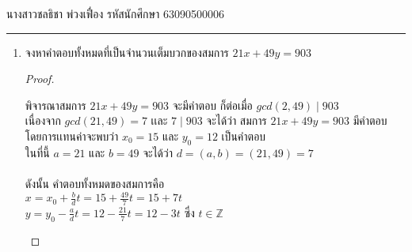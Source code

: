 \documentclass[12pt, a4paper]{article}
\begin{document}
\raggedleft นางสาวชลธิชา พ่วงเฟื่อง  รหัสนักศึกษา 63090500006 \\[12pt]
\hrule\vspace{12pt}
\raggedright

\begin{enumerate}
    \item จงหาคำตอบทั้งหมดที่เป็นจำนวนเต็มบวกของสมการ $21x+49y=903$\\ 
    
    
    \begin{proof}
        \begin{enumerate}พิจารณาสมการ $21x+49y=903$ จะมีคำตอบ ก็ต่อเมื่อ $gcd(2,49)\mid 903$\\
            เนื่องจาก $gcd(21,49)=7$ เเละ $7\mid 903$ จะได้ว่า สมการ  $21x+49y=903$  มีคำตอบ\\
            โดยการเเทนค่าจะพบว่า $x_0=15$ และ $y_0=12$ เป็นคำตอบ\\
            ในที่นี้ $a=21$ และ $b=49$ จะได้ว่า $d=(a,b)=(21,49)=7$
            \\\indent\\ดังนั้น คำตอบทั้งหมดของสมการคือ\\
                $x=x_{0}+\frac{b}{d}t=15+\frac{49}{7}t=15+7t$\\
                $y=y_{0}-\frac{a}{d}t=12-\frac{21}{7}t=12-3t$     ซึ่ง $t\in \mathbb{Z}$\\
              
        \end{enumerate}
    \end{proof}

\end{enumerate}
\end{document}
